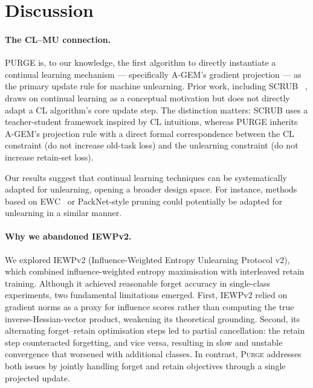 \documentclass{article}
\newcommand{\ours}{\textsc{Purge}}
\begin{document}
\section{Discussion}\label{sec:discussion}

\paragraph{The CL--MU connection.}
PURGE is, to our knowledge, the first algorithm to directly instantiate a continual learning mechanism — specifically A-GEM's gradient projection — as the primary update rule for machine unlearning. Prior work, including SCRUB ~\cite{kurmanji2023unbounded}, draws on continual learning as a conceptual motivation but does not directly adapt a CL algorithm's core update step. The distinction matters: SCRUB uses a teacher-student framework inspired by CL intuitions, whereas PURGE inherits A-GEM's projection rule with a direct formal correspondence between the CL constraint (do not increase old-task loss) and the unlearning constraint (do not increase retain-set loss).


Our results suggest that continual learning techniques can be systematically adapted for unlearning, opening a broader design space.
For instance, methods based on EWC~\cite{golatkar2020eternal} or PackNet-style pruning could potentially be adapted for unlearning in a similar manner.

\paragraph{Why we abandoned IEWPv2.}
We explored IEWPv2 (Influence-Weighted Entropy Unlearning Protocol v2), which combined influence-weighted entropy maximisation with interleaved retain training.
Although it achieved reasonable forget accuracy in single-class experiments, two fundamental limitations emerged.
First, IEWPv2 relied on gradient norms as a proxy for influence scores rather than computing the true inverse-Hessian-vector product, weakening its theoretical grounding.
Second, its alternating forget--retain optimisation steps led to partial cancellation: the retain step counteracted forgetting, and vice versa, resulting in slow and unstable convergence that worsened with additional classes.
In contrast, \ours{} addresses both issues by jointly handling forget and retain objectives through a single projected update.
\end{document}
